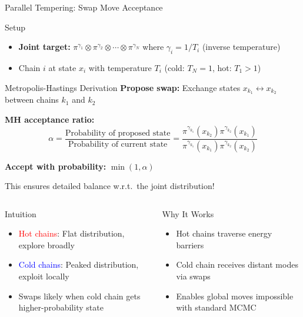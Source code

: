 \documentclass[aspectratio=169]{beamer}
\begin{document}
\begin{frame}{Parallel Tempering: Swap Move Acceptance}

\begin{block}{Setup}
\begin{itemize}
    \item \textbf{Joint target:} $\pi^{\gamma_1} \otimes \pi^{\gamma_2} \otimes \cdots \otimes \pi^{\gamma_N}$ where $\gamma_i = 1/T_i$ (inverse temperature)
    \item Chain $i$ at state $x_i$ with temperature $T_i$ (cold: $T_N=1$, hot: $T_1 > 1$)
\end{itemize}
\end{block}

\begin{block}{Metropolis-Hastings Derivation}
\textbf{Propose swap:} Exchange states $x_{k_1} \leftrightarrow x_{k_2}$ between chains $k_1$ and $k_2$

\textbf{MH acceptance ratio:}
$$\alpha = \frac{\text{Probability of proposed state}}{\text{Probability of current state}} = \frac{\pi^{\gamma_{k_1}}(x_{k_2})\pi^{\gamma_{k_2}}(x_{k_1})}{\pi^{\gamma_{k_1}}(x_{k_1})\pi^{\gamma_{k_2}}(x_{k_2})}$$

\textbf{Accept with probability:} $\min(1, \alpha)$

This ensures detailed balance w.r.t.\ the joint distribution!
\end{block}

\begin{columns}[t]
\begin{column}{0.48\textwidth}
\begin{block}{Intuition}
\begin{itemize}
    \item \textcolor{red}{Hot chains}: Flat distribution, explore broadly
    \item \textcolor{blue}{Cold chains}: Peaked distribution, exploit locally
    \item Swaps likely when cold chain gets higher-probability state
\end{itemize}
\end{block}
\end{column}

\begin{column}{0.48\textwidth}
\begin{block}{Why It Works}
\begin{itemize}
    \item Hot chains traverse energy barriers
    \item Cold chain receives distant modes via swaps
    \item Enables global moves impossible with standard MCMC
\end{itemize}
\end{block}
\end{column}
\end{columns}

\end{frame}
\end{document}
